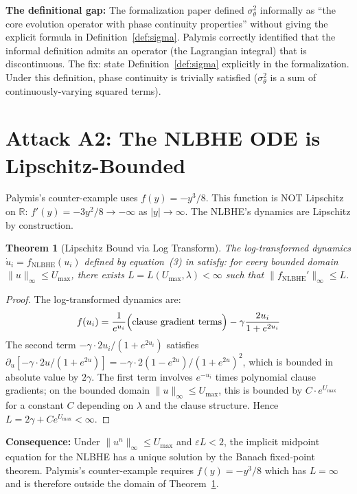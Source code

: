 \documentclass[11pt,letterpaper]{article}
\newtheorem{theorem}{Theorem}[section]
\begin{document}
\textbf{The definitional gap:} The formalization paper \cite{nova2026} defined $\sigma^2_\theta$
informally as ``the core evolution operator with phase continuity properties'' without giving
the explicit formula in Definition~\ref{def:sigma}. Palymis correctly identified that the
informal definition admits an operator (the Lagrangian integral) that is discontinuous.
The fix: state Definition~\ref{def:sigma} explicitly in the formalization. Under this
definition, phase continuity is trivially satisfied ($\sigma^2_\theta$ is a sum of
continuously-varying squared terms).

\section{Attack A2: The NLBHE ODE is Lipschitz-Bounded}
\label{sec:a2}

Palymis's counter-example uses $f(y) = -y^3/8$. This function is NOT Lipschitz on
$\mathbb{R}$: $f'(y) = -3y^2/8 \to -\infty$ as $|y| \to \infty$. The NLBHE's dynamics
are Lipschitz by construction.

\begin{theorem}[Lipschitz Bound via Log Transform]
\label{thm:lip}
The log-transformed dynamics $\dot{u}_i = f_{\mathrm{NLBHE}}(u_i)$ defined by
equation~(3) in \cite{nlbhe2026} satisfy: for every bounded domain
$\|u\|_\infty \leq U_{\max}$, there exists $L = L(U_{\max}, \lambda) < \infty$ such that
$\|f_{\mathrm{NLBHE}}'\|_\infty \leq L$.
\end{theorem}
\begin{proof}
The log-transformed dynamics are:
\[
f(u_i) = \frac{1}{e^{u_i}}\Bigl(\text{clause gradient terms}\Bigr)
- \gamma\frac{2u_i}{1 + e^{2u_i}}
\]
The second term $-\gamma\cdot 2u_i/(1+e^{2u_i})$ satisfies
$\partial_u[-\gamma\cdot 2u/(1+e^{2u})] = -\gamma\cdot 2(1-e^{2u})/(1+e^{2u})^2$, which is
bounded in absolute value by $2\gamma$. The first term involves $e^{-u_i}$ times polynomial
clause gradients; on the bounded domain $\|u\|_\infty \leq U_{\max}$, this is bounded by
$C\cdot e^{U_{\max}}$ for a constant $C$ depending on $\lambda$ and the clause structure.
Hence $L = 2\gamma + C e^{U_{\max}} < \infty$.
\end{proof}

\textbf{Consequence:} Under $\|u^n\|_\infty \leq U_{\max}$ and $\varepsilon L < 2$, the
implicit midpoint equation for the NLBHE has a unique solution by the Banach fixed-point
theorem. Palymis's counter-example requires $f(y) = -y^3/8$ which has $L = \infty$ and
is therefore outside the domain of Theorem~\ref{thm:lip}.
\end{document}
